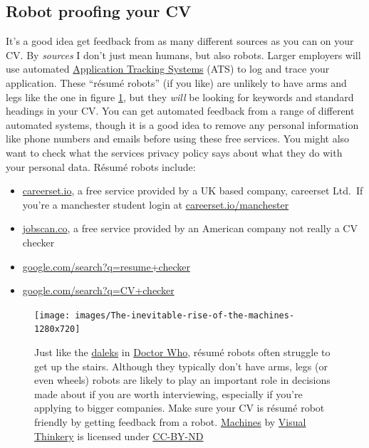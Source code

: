 \documentclass[
]{book}
\providecommand{\tightlist}{%
  \setlength{\itemsep}{0pt}\setlength{\parskip}{0pt}}
\begin{document}
\hypertarget{robotproof}{%
\subsection{Robot proofing your CV}\label{robotproof}}

It's a good idea get feedback from as many different sources as you can on your CV. By \emph{sources} I don't just mean humans, but also robots. Larger employers will use automated \href{https://en.wikipedia.org/wiki/Applicant_tracking_system}{Application Tracking Systems} (ATS) to log and trace your application. These ``résumé robots'' (if you like) are unlikely to have arms and legs like the one in figure \ref{fig:machines-fig}, but they \emph{will} be looking for keywords and standard headings in your CV. \citep{airesume} You can get automated feedback from a range of different automated systems, though it is a good idea to remove any personal information like phone numbers and emails before using these free services. You might also want to check what the services privacy policy says about what they do with your personal data. Résumé robots include:

\begin{itemize}
\tightlist
\item
  \href{https://careerset.io}{careerset.io}, a free service provided by a UK based company, careerset Ltd.~If you're a manchester student login at \href{https://careerset.io/manchester}{careerset.io/manchester}
\item
  \href{https://www.jobscan.co}{jobscan.co}, a free service provided by an American company not really a CV checker
\item
  \href{https://www.google.com/search?q=resume+checker}{google.com/search?q=resume+checker}
\item
  \href{https://www.google.com/search?q=cv+checker}{google.com/search?q=CV+checker}
\end{itemize}

\begin{figure}

{\centering \texttt{[image: images/The-inevitable-rise-of-the-machines-1280x720]} 

}

\caption{Just like the \href{https://en.wikipedia.org/wiki/Dalek}{daleks} in \href{https://en.wikipedia.org/wiki/Doctor_Who}{Doctor Who}, résumé robots often struggle to get up the stairs. Although they typically don't have arms, legs (or even wheels) robots are likely to play an important role in decisions made about if you are worth interviewing, especially if you're applying to bigger companies. Make sure your CV is résumé robot friendly by getting feedback from a robot. \href{https://bryanmmathers.com/machines/}{Machines} by \href{https://visualthinkery.com/}{Visual Thinkery} is licensed under \href{https://creativecommons.org/licenses/by-nd/4.0/}{CC-BY-ND}}\label{fig:machines-fig}
\end{figure}
\end{document}
